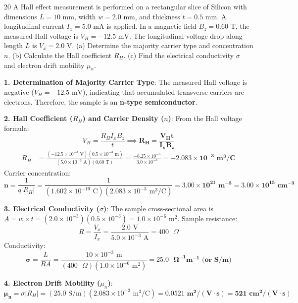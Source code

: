 \begin{theoryq}{20}
A Hall effect measurement is performed on a rectangular slice of Silicon with dimensions $L = 10\text{ mm}$, width $w = 2.0\text{ mm}$, and thickness $t = 0.5\text{ mm}$. A longitudinal current $I_x = 5.0\text{ mA}$ is applied. In a magnetic field $B_z = 0.60\text{ T}$, the measured Hall voltage is $V_H = -12.5\text{ mV}$. The longitudinal voltage drop along length $L$ is $V_x = 2.0\text{ V}$. (a) Determine the majority carrier type and concentration $n$. (b) Calculate the Hall coefficient $R_H$. (c) Find the electrical conductivity $\sigma$ and electron drift mobility $\mu_n$.
\end{theoryq}
\begin{theorysol}
\textbf{1. Determination of Majority Carrier Type}:
The measured Hall voltage is negative ($V_H = -12.5\text{ mV}$), indicating that accumulated transverse carriers are electrons.
Therefore, the sample is an \textbf{n-type semiconductor}.

\textbf{2. Hall Coefficient ($R_H$) and Carrier Density ($n$)}:
From the Hall voltage formula:
\begin{equation}
V_H = \frac{R_H I_x B_z}{t} \implies \mathbf{R_H = \frac{V_H t}{I_x B_z}}
\end{equation}
\begin{align*}
R_H &= \frac{(-12.5 \times 10^{-3}\text{ V})(0.5 \times 10^{-3}\text{ m})}{(5.0 \times 10^{-3}\text{ A})(0.60\text{ T})} = \frac{-6.25 \times 10^{-6}}{3.0 \times 10^{-3}} = \mathbf{-2.083 \times 10^{-3}\text{ m}^3/\text{C}}
\end{align*}
Carrier concentration:
\begin{equation}
\mathbf{n} = \frac{1}{q |R_H|} = \frac{1}{(1.602 \times 10^{-19}\text{ C})(2.083 \times 10^{-3}\text{ m}^3/\text{C})} = \mathbf{3.00 \times 10^{21}\text{ m}^{-3}} = \mathbf{3.00 \times 10^{15}\text{ cm}^{-3}}
\end{equation}

\textbf{3. Electrical Conductivity ($\sigma$)}:
The sample cross-sectional area is $A = w \times t = (2.0 \times 10^{-3})(0.5 \times 10^{-3}) = 1.0 \times 10^{-6}\text{ m}^2$.
Sample resistance:
\begin{equation}
R = \frac{V_x}{I_x} = \frac{2.0\text{ V}}{5.0 \times 10^{-3}\text{ A}} = 400\text{ }\Omega
\end{equation}
Conductivity:
\begin{equation}
\mathbf{\sigma} = \frac{L}{R A} = \frac{10 \times 10^{-3}\text{ m}}{(400\text{ }\Omega)(1.0 \times 10^{-6}\text{ m}^2)} = \mathbf{25.0\text{ }\Omega^{-1}\text{m}^{-1}\text{ (or S/m)}}
\end{equation}

\textbf{4. Electron Drift Mobility ($\mu_n$)}:
\begin{equation}
\mathbf{\mu_n} = \sigma |R_H| = (25.0\text{ S/m})(2.083 \times 10^{-3}\text{ m}^3/\text{C}) = \mathbf{0.0521\text{ m}^2/(\text{V}\cdot\text{s})} = \mathbf{521\text{ cm}^2/(\text{V}\cdot\text{s})}
\end{equation}
\end{theorysol}
\vspace{4mm}
